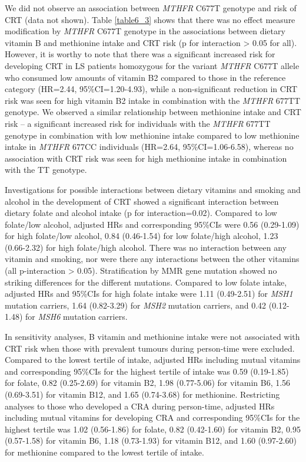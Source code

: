 \noindent We did not observe an association between \emph{MTHFR} C677T genotype and risk of CRT (data not shown). Table \ref{table6_3} shows that there was no effect measure modification by \emph{MTHFR} C677T genotype in the associations between dietary vitamin B and methionine intake and CRT risk (p for interaction > 0.05 for all). However, it is worthy to note that there was a significant increased risk for developing CRT in LS patients homozygous for the variant \emph{MTHFR} C677T allele who consumed low amounts of vitamin B2 compared to those in the reference category (HR=2.44, 95\%CI=1.20-4.93), while a non-significant reduction in CRT risk was seen for high vitamin B2 intake in combination with the \emph{MTHFR} 677TT genotype. We observed a similar relationship between methionine intake and CRT risk -- a significant increased risk for individuals with the \emph{MTHFR} 677TT genotype in combination with low methionine intake compared to low methionine intake in \emph{MTHFR} 677CC individuals (HR=2.64, 95\%CI=1.06-6.58), whereas no association with CRT risk was seen for high methionine intake in combination with the TT genotype.

\noindent Investigations for possible interactions between dietary vitamins and smoking and alcohol in the development of CRT showed a significant interaction between dietary folate and alcohol intake (p for interaction=0.02). Compared to low folate/low alcohol, adjusted HRs and corresponding 95\%CIs were 0.56 (0.29-1.09) for high folate/low alcohol, 0.84 (0.46-1.54) for low folate/high alcohol, 1.23 (0.66-2.32) for high folate/high alcohol. There was no interaction between any vitamin and smoking, nor were there any interactions between the other vitamins (all p-interaction > 0.05). Stratification by MMR gene mutation showed no striking differences for the different mutations. Compared to low folate intake, adjusted HRs and 95\%CIs for high folate intake were 1.11 (0.49-2.51) for \emph{MSH1} mutation carriers, 1.64 (0.82-3.29) for \emph{MSH2} mutation carriers, and 0.42 (0.12-1.48) for \emph{MSH6} mutation carriers.

\noindent In sensitivity analyses, B vitamin and methionine intake were not associated with CRT risk when those with prevalent tumours during person-time were excluded. Compared to the lowest tertile of intake, adjusted HRs including mutual vitamins and corresponding 95\%CIs for the highest tertile of intake was 0.59 (0.19-1.85) for folate, 0.82 (0.25-2.69) for vitamin B2, 1.98 (0.77-5.06) for vitamin B6, 1.56 (0.69-3.51) for vitamin B12, and 1.65 (0.74-3.68) for methionine. Restricting analyses to those who developed a CRA during person-time, adjusted HRs including mutual vitamins for developing CRA and corresponding 95\%CIs for the highest tertile was 1.02 (0.56-1.86) for folate, 0.82 (0.42-1.60) for vitamin B2, 0.95 (0.57-1.58) for vitamin B6, 1.18 (0.73-1.93) for vitamin B12, and 1.60 (0.97-2.60) for methionine compared to the lowest tertile of intake.

